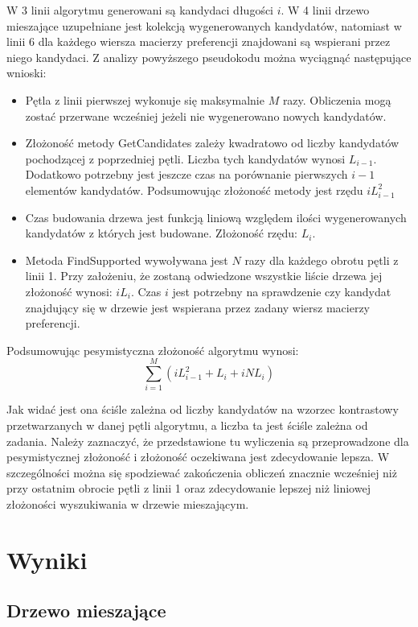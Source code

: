 \documentclass[a4paper,12pt]{article}
\begin{document}
W 3 linii algorytmu generowani są kandydaci długości $i$. W 4 linii drzewo mieszające uzupełniane jest kolekcją wygenerowanych kandydatów, natomiast w linii 6 dla każdego wiersza macierzy preferencji znajdowani są wspierani przez niego kandydaci.
Z analizy powyższego pseudokodu można wyciągnąć następujące wnioski:
\begin{itemize}
\item Pętla z linii pierwszej wykonuje się maksymalnie $M$ razy. Obliczenia mogą zostać przerwane wcześniej jeżeli nie wygenerowano nowych kandydatów.
\item Złożoność metody GetCandidates zależy kwadratowo od liczby kandydatów pochodzącej z poprzedniej pętli. Liczba tych kandydatów wynosi $L_{i-1}$. Dodatkowo potrzebny jest jeszcze czas na porównanie pierwszych $i-1$ elementów kandydatów. Podsumowując złożoność metody jest rzędu $iL_{i-1}^2$
\item Czas budowania drzewa jest funkcją liniową względem ilości wygenerowanych kandydatów z których jest budowane. Złożoność rzędu: $L_i$.
\item Metoda FindSupported wywoływana jest $N$ razy dla każdego obrotu pętli z linii 1.  Przy założeniu, że zostaną odwiedzone wszystkie liście drzewa jej złożoność wynosi: $iL_i$. Czas $i$ jest potrzebny na sprawdzenie czy kandydat znajdujący się w drzewie jest wspierana przez zadany wiersz macierzy preferencji.
\end{itemize}

Podsumowując pesymistyczna złożoność algorytmu wynosi:
$$ \sum_{i=1}^M (iL_{i-1}^2 + L_i + iNL_i) $$

Jak widać jest ona ściśle zależna od liczby kandydatów na wzorzec kontrastowy przetwarzanych w danej pętli algorytmu, a liczba ta jest ściśle zależna od zadania. Należy zaznaczyć, że przedstawione tu wyliczenia są przeprowadzone dla pesymistycznej złożoność i złożoność oczekiwana jest zdecydowanie lepsza. W szczególności można się spodziewać zakończenia obliczeń znacznie wcześniej niż przy ostatnim obrocie pętli z linii 1 oraz zdecydowanie lepszej niż liniowej złożoności wyszukiwania w drzewie mieszającym.


\section{Wyniki}

\subsection{Drzewo mieszające}
\end{document}
